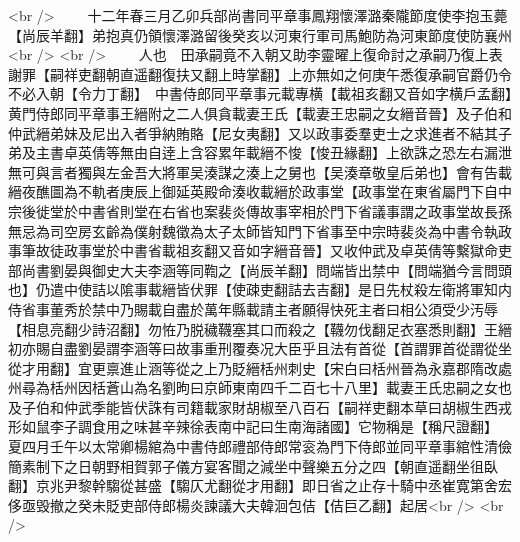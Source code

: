 <br />
　　十二年春三月乙卯兵部尚書同平章事鳳翔懷澤潞秦隴節度使李抱玉薨【尚辰羊翻】弟抱真仍領懷澤潞留後癸亥以河東行軍司馬鮑防為河東節度使防襄州<br />
<br />
　　人也　田承嗣竟不入朝又助李靈曜上復命討之承嗣乃復上表謝罪【嗣祥吏翻朝直遥翻復扶又翻上時掌翻】上亦無如之何庚午悉復承嗣官爵仍令不必入朝【令力丁翻】　中書侍郎同平章事元載專横【載祖亥翻又音如字横戶孟翻】黄門侍郎同平章事王縉附之二人俱貪載妻王氏【載妻王忠嗣之女縉音晉】及子伯和仲武縉弟妹及尼出入者爭納賄賂【尼女夷翻】又以政事委羣吏士之求進者不結其子弟及主書卓英倩等無由自逹上含容累年載縉不悛【悛丑緣翻】上欲誅之恐左右漏泄無可與言者獨與左金吾大將軍吴湊謀之湊上之舅也【吴湊章敬皇后弟也】會有告載縉夜醮圖為不軌者庚辰上御延英殿命湊收載縉於政事堂【政事堂在東省屬門下自中宗後徙堂於中書省則堂在右省也案裴炎傳故事宰相於門下省議事謂之政事堂故長孫無忌為司空房玄齡為僕射魏徵為太子太師皆知門下省事至中宗時裴炎為中書令執政事筆故徒政事堂於中書省載祖亥翻又音如字縉音晉】又收仲武及卓英倩等繫獄命吏部尚書劉晏與御史大夫李涵等同鞫之【尚辰羊翻】問端皆出禁中【問端猶今言問頭也】仍遣中使詰以隂事載縉皆伏罪【使疎吏翻詰去吉翻】是日先杖殺左衛將軍知内侍省事董秀於禁中乃賜載自盡於萬年縣載請主者願得快死主者曰相公須受少汚辱【相息亮翻少詩沼翻】勿恠乃脱穢韈塞其口而殺之【韈勿伐翻足衣塞悉則翻】王縉初亦賜自盡劉晏謂李涵等曰故事重刑覆奏况大臣乎且法有首從【首謂罪首從謂從坐從才用翻】宜更禀進止涵等從之上乃貶縉栝州刺史【宋白曰栝州晉為永嘉郡隋改處州尋為栝州因栝蒼山為名劉昫曰京師東南四千二百七十八里】載妻王氏忠嗣之女也及子伯和仲武季能皆伏誅有司籍載家財胡椒至八百石【嗣祥吏翻本草曰胡椒生西戎形如鼠李子調食用之味甚辛辣徐表南中記曰生南海諸國】它物稱是【稱尺證翻】　夏四月壬午以太常卿楊綰為中書侍郎禮部侍郎常衮為門下侍郎並同平章事綰性清儉簡素制下之日朝野相賀郭子儀方宴客聞之減坐中聲樂五分之四【朝直遥翻坐徂臥翻】京兆尹黎幹騶從甚盛【騶仄尤翻從才用翻】即日省之止存十騎中丞崔寛第舍宏侈亟毁撤之癸未貶吏部侍郎楊炎諫議大夫韓洄包佶【佶巨乙翻】起居<br />
<br />
